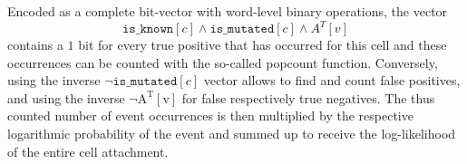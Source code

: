 Encoded as a complete bit-vector with word-level binary operations, the vector 
\begin{equation}
\label{eq:vector}
\texttt{is\_known}[c] \wedge \texttt{is\_mutated}[c] \wedge A^T[v]
\end{equation}
contains a $1$ bit for every true positive that has occurred for this cell and these occurrences can be counted with the so-called popcount function. Conversely, using the inverse $\neg\texttt{is\_mutated}[c]$ vector allows to find and count false positives, and using the inverse $\neg\mathrm{A^T[v]}$ for false respectively true negatives. The thus counted number of event occurrences is then multiplied by the respective logarithmic probability of the event and summed up to receive the log-likelihood of the entire cell attachment.

